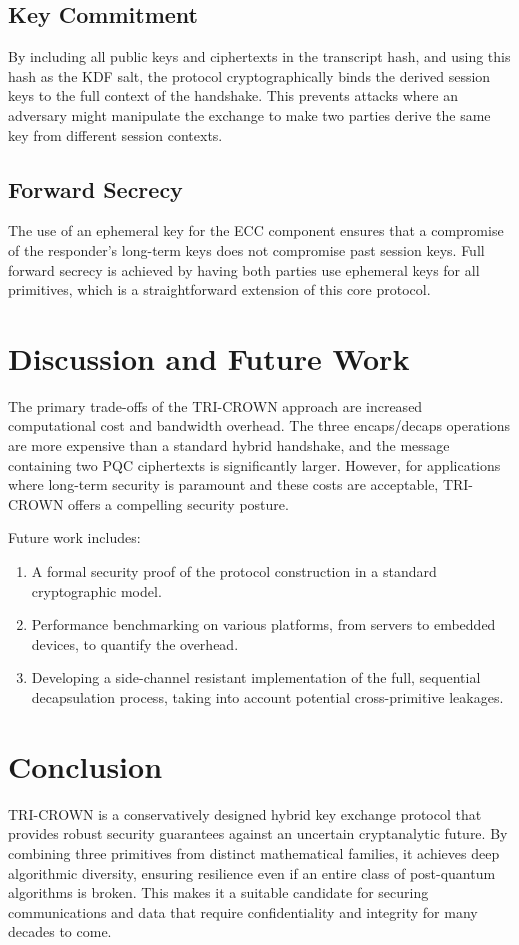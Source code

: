 \documentclass[11pt]{article}
\begin{document}
\subsection{Key Commitment}
By including all public keys and ciphertexts in the transcript hash, and using this hash as the KDF salt, the protocol cryptographically binds the derived session keys to the full context of the handshake. This prevents attacks where an adversary might manipulate the exchange to make two parties derive the same key from different session contexts.

\subsection{Forward Secrecy}
The use of an ephemeral key for the ECC component ensures that a compromise of the responder's long-term keys does not compromise past session keys. Full forward secrecy is achieved by having both parties use ephemeral keys for all primitives, which is a straightforward extension of this core protocol.

\section{Discussion and Future Work}
The primary trade-offs of the TRI-CROWN approach are increased computational cost and bandwidth overhead. The three encaps/decaps operations are more expensive than a standard hybrid handshake, and the message containing two PQC ciphertexts is significantly larger. However, for applications where long-term security is paramount and these costs are acceptable, TRI-CROWN offers a compelling security posture.

Future work includes:
\begin{enumerate}
    \item A formal security proof of the protocol construction in a standard cryptographic model.
    \item Performance benchmarking on various platforms, from servers to embedded devices, to quantify the overhead.
    \item Developing a side-channel resistant implementation of the full, sequential decapsulation process, taking into account potential cross-primitive leakages.
\end{enumerate}

\section{Conclusion}
TRI-CROWN is a conservatively designed hybrid key exchange protocol that provides robust security guarantees against an uncertain cryptanalytic future. By combining three primitives from distinct mathematical families, it achieves deep algorithmic diversity, ensuring resilience even if an entire class of post-quantum algorithms is broken. This makes it a suitable candidate for securing communications and data that require confidentiality and integrity for many decades to come.
\end{document}
